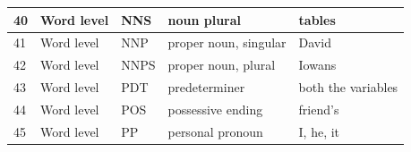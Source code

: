 \begin{longtable}{|p{}|p{}|p{}|p{}|p{}|}
		\rowcolor[HTML]{FFCCC9} 
		40                                                        & Word level                                                  & NNS                                                        & noun plural                                                                                                     & tables                                                                          \\ \hline
		\rowcolor[HTML]{FFCCC9} 
		41                                                        & Word level                                                  & NNP                                                        & proper noun, singular                                                                                           & David                                                                           \\ \hline
		\rowcolor[HTML]{FFCCC9} 
		42                                                        & Word level                                                  & NNPS                                                       & proper noun, plural                                                                                             & Iowans                                                                          \\ \hline
		\rowcolor[HTML]{FFFFC7} 
		43                                                        & Word level                                                  & PDT                                                        & predeterminer                                                                                                   & both the variables                                                              \\ \hline
		\rowcolor[HTML]{FFFFC7} 
		44                                                        & Word level                                                  & POS                                                        & possessive ending                                                                                               & friend’s                                                                        \\ \hline
		\rowcolor[HTML]{9AFF99} 
		45                                                        & Word level                                                  & PP                                                         & personal pronoun                                                                                                & I, he, it                                                                       \\ \hline

\end{longtable}
